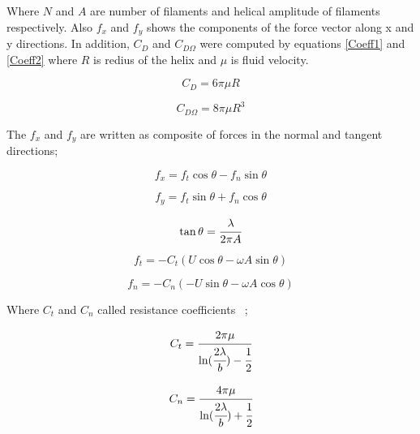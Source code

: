 \documentclass[12pt,a4paper,titlepage]{report}
\begin{document}
Where $N$ and $A$ are number of filaments and helical amplitude of filaments respectively. Also $f_x$ and 
$f_y$ shows the components of the force vector along x and y directions. In addition, $C_D$ and $C_{D\Omega}$
were computed by equations \ref{Coeff1} and \ref{Coeff2} where $R$ is redius of the helix and $\mu$ is fluid velocity.


\begin{equation}
 C_D  = 6 \pi \mu R
\label{Coeff1}
\end{equation}



\begin{equation}
 C_{D\Omega}= 8 \pi \mu R^3
\label{Coeff2}
\end{equation}

The $f_x$ and $f_y$ are written as composite of forces in the normal and tangent directions;

\begin{equation}
 f_x  = f_t\cos \theta - f_n\sin \theta
\label{normal}
\end{equation}



\begin{equation}
 f_y = f_t\sin \theta + f_n\cos \theta
\label{tangant}
\end{equation}

\begin{equation}
 \tan \theta  = \cfrac{\lambda}{2\pi A}
\label{tang}
\end{equation}



\begin{equation}
 f_t = -C_t(U \cos \theta - \omega A \sin \theta)
\label{normal_f}
\end{equation}



\begin{equation}
f_n = - C_n(-U \sin \theta - \omega A \cos \theta)
\label{tangant_f}
\end{equation}

Where $C_t$ and $C_n$ called resistance coefficients ~\citep{edd2003biomimetic};
 

\begin{equation}
 C_t = \cfrac{2 \pi \mu}{\ln (\cfrac{2 \lambda}{b}) - \cfrac{1}{2}}
\label{Coeffient1}
\end{equation}



\begin{equation}
 C_n = \cfrac{4 \pi \mu}{\ln (\cfrac{2 \lambda}{b}) + \cfrac{1}{2}}
\label{Coeffient1}
\end{equation}
\end{document}
